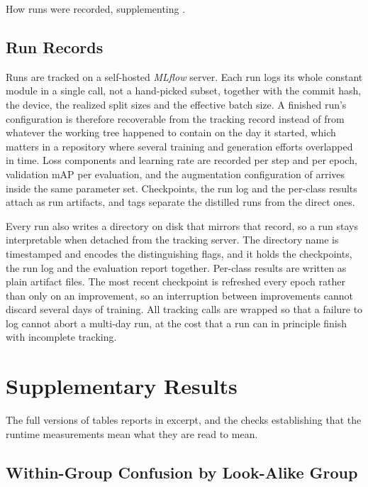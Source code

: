 How runs were recorded, supplementing .

\subsection{Run Records}\label{sec:appendix_experiment_tracking}

Runs are tracked on a self-hosted \textit{MLflow} \cite{mlflowPythonAPI2024} server. Each run logs its whole constant module in a single call, not a hand-picked subset, together with the commit hash, the device, the realized split sizes and the effective batch size. A finished run's configuration is therefore recoverable from the tracking record instead of from whatever the working tree happened to contain on the day it started, which matters in a repository where several training and generation efforts overlapped in time. Loss components and learning rate are recorded per step and per epoch, validation mAP per evaluation, and the augmentation configuration of  arrives inside the same parameter set. Checkpoints, the run log and the per-class results attach as run artifacts, and tags separate the distilled runs from the direct ones.

Every run also writes a directory on disk that mirrors that record, so a run stays interpretable when detached from the tracking server. The directory name is timestamped and encodes the distinguishing flags, and it holds the checkpoints, the run log and the evaluation report together. Per-class results are written as plain artifact files. The most recent checkpoint is refreshed every epoch rather than only on an improvement, so an interruption between improvements cannot discard several days of training. All tracking calls are wrapped so that a failure to log cannot abort a multi-day run, at the cost that a run can in principle finish with incomplete tracking.

\section{Supplementary Results}\label{sec:appendix_results_supplement}

The full versions of tables  reports in excerpt, and the checks establishing that the runtime measurements mean what they are read to mean.

\subsection{Within-Group Confusion by Look-Alike Group}\label{sec:appendix_lookalike_confusion}

